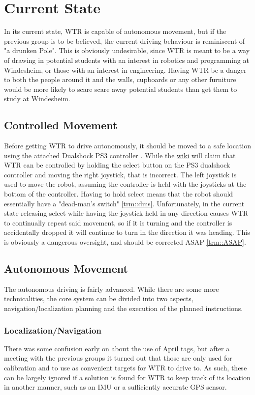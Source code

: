 \section{Current State}
In its current state, WTR is capable of autonomous movement, but if the previous group is to be believed, the current driving behaviour is reminiscent of "a drunken Pole".
This is obviously undesirable, since WTR is meant to be a way of drawing in potential students with an interest in robotics and programming at Windesheim, or those with an interest in engineering.
Having WTR be a danger to both the people around it and the walls, cupboards or any other furniture would be more likely to scare scare away potential students than get them to study at Windesheim.

\subsection{Controlled Movement}
Before getting WTR to drive autonomously, it should be moved to a safe location using the attached Dualshock PS3 controller \cite{dualshock}.
While the \href{https://windesheim-willy.github.io/WillyWiki/components/joystick.html}{wiki} will claim that WTR can be controlled by holding the select button on the PS3 dualshock controller and moving the right joystick, that is incorrect.
The left joystick is used to move the robot, assuming the controller is held with the joysticks at the bottom of the controller.
Having to hold select means that the robot should essentially have a "dead-man's switch" \ref{trm::dms}.
Unfortunately, in the current state releasing select while having the joystick held in any direction causes WTR to continually repeat said movement, so if it is turning and the controller is accidentally dropped it will continue to turn in the direction it was heading.
This is obviously a dangerous oversight, and should be corrected ASAP \ref{trm::ASAP}.

\subsection{Autonomous Movement}
The autonomous driving is fairly advanced.
While there are some more technicalities, the core system can be divided into two aspects, navigation/localization planning and the execution of the planned instructions.


\subsubsection{Localization/Navigation}
There was some confusion early on about the use of April tags, but after a meeting with the previous groups it turned out that those are only used for calibration and to use as convenient targets for WTR to drive to.
As such, these can be largely ignored if a solution is found for WTR to keep track of its location in another manner, such as an IMU or a sufficiently accurate GPS sensor.


